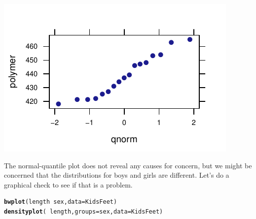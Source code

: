 \documentclass[twoside]{book}\usepackage[]{graphicx}\usepackage[]{xcolor}
\makeatletter
\def\maxwidth{ %
  \ifdim\Gin@nat@width>\linewidth
    \linewidth
  \else
    \Gin@nat@width
  \fi
}
\newcommand{\hlopt}[1]{\textcolor[rgb]{0,0,0}{#1}}%
\newcommand{\hlstd}[1]{\textcolor[rgb]{0.345,0.345,0.345}{#1}}%
\newcommand{\hlkwc}[1]{\textcolor[rgb]{0.333,0.667,0.333}{#1}}%
\newcommand{\hlkwd}[1]{\textcolor[rgb]{0.737,0.353,0.396}{\textbf{#1}}}%
\newenvironment{kframe}{%
 \def\at@end@of@kframe{}%
 \ifinner\ifhmode%
  \def\at@end@of@kframe{\end{minipage}}%
  \begin{minipage}{\columnwidth}%
 \fi\fi%
 \def\FrameCommand##1{\hskip\@totalleftmargin \hskip-\fboxsep
 \colorbox{shadecolor}{##1}\hskip-\fboxsep
     \hskip-\linewidth \hskip-\@totalleftmargin \hskip\columnwidth}%
 \MakeFramed {\advance\hsize-\width
   \@totalleftmargin\z@ \linewidth\hsize
   \@setminipage}}%
 {\par\unskip\endMakeFramed%
 \at@end@of@kframe}
\newenvironment{knitrout}{}{} %
\makeatother
\begin{document}
\begin{solution}
\begin{knitrout}
{\centering \includegraphics[width=\maxwidth]{figures/fig-unnamed-chunk-157-1} 

}



\end{knitrout}
The normal-quantile plot does not reveal any causes for concern, but 
we might be concerned that the distributions for boys and girls are different.  Let's do
a graphical check to see if that is a problem.
\begin{knitrout}
\color{fgcolor}\begin{kframe}
\begin{alltt}
\hlkwd{bwplot}\hlstd{(length} \hlopt{~} \hlstd{sex,} \hlkwc{data} \hlstd{= KidsFeet)}
\hlkwd{densityplot}\hlstd{(}\hlopt{~}\hlstd{length,} \hlkwc{groups} \hlstd{= sex,} \hlkwc{data} \hlstd{= KidsFeet)}
\end{alltt}
\end{kframe}


\end{knitrout}
\end{solution}
\end{document}
